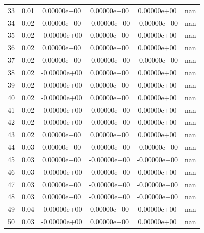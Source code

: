 \documentclass[12pt]{article}
\begin{document}
\begin{tabular}{ c | c | c | c | c | c }
33 & 0.01 & 0.00000e+00 & 0.00000e+00 & 0.00000e+00 & nan \\
34 & 0.02 & 0.00000e+00 & -0.00000e+00 & -0.00000e+00 & nan \\
35 & 0.02 & -0.00000e+00 & 0.00000e+00 & 0.00000e+00 & nan \\
36 & 0.02 & 0.00000e+00 & 0.00000e+00 & 0.00000e+00 & nan \\
37 & 0.02 & 0.00000e+00 & -0.00000e+00 & -0.00000e+00 & nan \\
38 & 0.02 & -0.00000e+00 & 0.00000e+00 & 0.00000e+00 & nan \\
39 & 0.02 & -0.00000e+00 & 0.00000e+00 & 0.00000e+00 & nan \\
40 & 0.02 & -0.00000e+00 & 0.00000e+00 & 0.00000e+00 & nan \\
41 & 0.02 & -0.00000e+00 & -0.00000e+00 & 0.00000e+00 & nan \\
42 & 0.02 & -0.00000e+00 & -0.00000e+00 & 0.00000e+00 & nan \\
43 & 0.02 & 0.00000e+00 & 0.00000e+00 & 0.00000e+00 & nan \\
44 & 0.03 & 0.00000e+00 & -0.00000e+00 & -0.00000e+00 & nan \\
45 & 0.03 & 0.00000e+00 & -0.00000e+00 & -0.00000e+00 & nan \\
46 & 0.03 & -0.00000e+00 & -0.00000e+00 & 0.00000e+00 & nan \\
47 & 0.03 & 0.00000e+00 & -0.00000e+00 & -0.00000e+00 & nan \\
48 & 0.03 & 0.00000e+00 & -0.00000e+00 & -0.00000e+00 & nan \\
49 & 0.04 & -0.00000e+00 & 0.00000e+00 & 0.00000e+00 & nan \\
50 & 0.03 & -0.00000e+00 & 0.00000e+00 & 0.00000e+00 & nan \\
\end{tabular}
\newline
\newline
\end{document}
